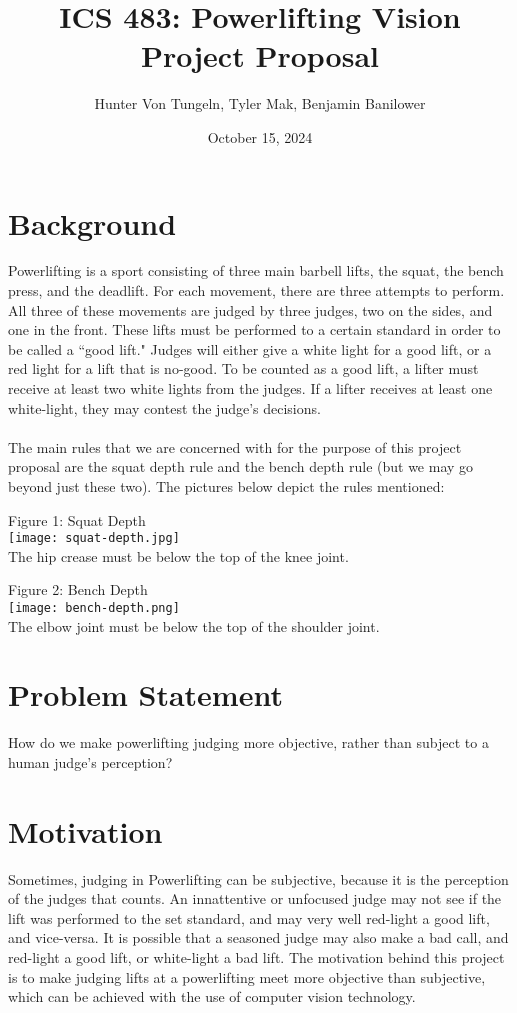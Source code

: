 \documentclass{article}
\title{ICS 483: Powerlifting Vision Project Proposal}
\author{Hunter Von Tungeln, Tyler Mak, Benjamin Banilower}
\date{October 15, 2024}
\begin{document}
\maketitle
\section{Background}
Powerlifting is a sport consisting of three main barbell lifts, the squat, the bench press, and the deadlift. For each movement, there are three attempts to perform. All three of these movements are judged by three judges, two on the sides, and one in the front. These lifts must be performed to a certain standard in order to be called a ``good lift." Judges will either give a white light for a good lift, or a red light for a lift that is no-good. To be counted as a good lift, a lifter must receive at least two white lights from the judges. If a lifter receives at least one white-light, they may contest the judge's decisions. \\ \\
The main rules that we are concerned with for the purpose of this project proposal are the squat depth rule and the bench depth rule (but we may go beyond just these two). The pictures below depict the rules mentioned: 
\begin{center}
Figure 1: Squat Depth \\
\texttt{[image: squat-depth.jpg]}\\
The hip crease must be below the top of the knee joint. 
\end{center}
\begin{center}
Figure 2: Bench Depth \\
\texttt{[image: bench-depth.png]}\\
The elbow joint must be below the top of the shoulder joint.  
\end{center}
\section{Problem Statement}
How do we make powerlifting judging more objective, rather than subject to a human judge's perception?
\section{Motivation}
Sometimes, judging in Powerlifting can be subjective, because it is the perception of the judges that counts.  An innattentive or unfocused judge may not see if the lift was performed to the set standard, and may very well red-light a good lift, and vice-versa. It is possible that a seasoned judge may also make a bad call, and red-light a good lift, or white-light a bad lift. The motivation behind this project is to make judging lifts at a powerlifting meet more objective than subjective, which can be achieved with the use of computer vision technology. 
\end{document}
